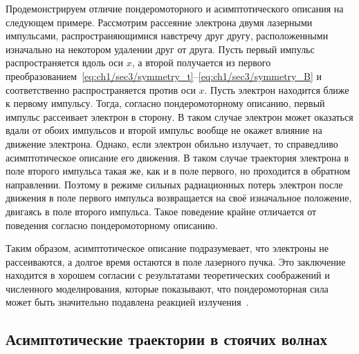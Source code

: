 Продемонстрируем отличие пондеромоторного и асимптотического описания на следующем примере. Рассмотрим рассеяние электрона двумя лазерными импульсами, распространяющимися навстречу друг другу, расположенными изначально на некотором удалении друг от друга. Пусть первый импульс распространяется вдоль оси $x$, а второй получается из первого преобразованием~\eqref{eq:ch1/sec3/symmetry_t}--\eqref{eq:ch1/sec3/symmetry_B} и соответственно распространяется против оси $x$. Пусть электрон находится ближе к первому импульсу. Тогда, согласно пондеромоторному описанию, первый импульс рассеивает электрон в сторону. В таком случае электрон может оказаться вдали от обоих импульсов и второй импульс вообще не окажет влияние на движение электрона. Однако, если электрон обильно излучает, то справедливо асимптотическое описание его движения. В таком случае траектория электрона в поле второго импульса такая же, как и в поле первого, но проходится в обратном направлении. Поэтому в режиме сильных радиационных потерь электрон после движения в поле первого импульса возвращается на своё изначальное положение, двигаясь в поле второго импульса. Такое поведение крайне отличается от поведения согласно пондеромоторному описанию.

Таким образом, асимптотическое описание подразумевает, что электроны не рассеиваются, а долгое время остаются в поле лазерного пучка. Это заключение находится в хорошем согласии с результатами теоретических соображений и численного моделирования, которые показывают, что пондеромоторная сила может быть значительно подавлена реакцией излучения~\cite{Fedotov14b, Ji14b}.

\subsection{Асимптотические траектории в стоячих волнах}
\label{standing-waves}

